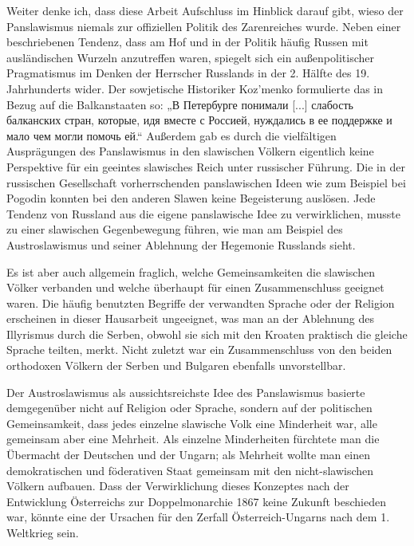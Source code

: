 \documentclass[12pt,headsepline,a4paper]{scrartcl}
\newcommand\textcyr[1]{{\fontencoding{OT2}\fontfamily{wncyr}\selectfont #1}}
\begin{document}
Weiter denke ich, dass diese Arbeit Aufschluss im Hinblick darauf gibt, wieso der
Panslawismus niemals zur offiziellen Politik des Zarenreiches wurde. Neben einer
beschriebenen Tendenz, dass am Hof und in der Politik häufig Russen mit ausländischen
Wurzeln anzutreffen waren, spiegelt sich ein außenpolitischer Pragmatismus im Denken der
Herrscher Russlands in der 2. Hälfte des 19. Jahrhunderts wider. Der sowjetische Historiker Koz'menko\autocite[191]{kozmenko}
formulierte das in Bezug auf die Balkanstaaten so: „\textcyr{В Петербурге понимали [...] слабость
балканских стран, которые, идя вместе с Россией, нуждались в ее поддержке и мало чем
могли помочь ей.}“ Außerdem gab es durch die vielfältigen Ausprägungen des Panslawismus
in den slawischen Völkern eigentlich keine Perspektive für ein geeintes slawisches Reich
unter russischer Führung. Die in der russischen Gesellschaft vorherrschenden panslawischen
Ideen wie zum Beispiel bei Pogodin konnten bei den anderen Slawen keine Begeisterung
auslösen. Jede Tendenz von Russland aus die eigene panslawische Idee zu verwirklichen,
musste zu einer slawischen Gegenbewegung führen, wie man am Beispiel des
Austroslawismus und seiner Ablehnung der Hegemonie Russlands sieht.

Es ist aber auch allgemein fraglich, welche Gemeinsamkeiten die slawischen Völker
verbanden und welche überhaupt für einen Zusammenschluss geeignet waren. Die häufig
benutzten Begriffe der verwandten Sprache oder der Religion erscheinen in dieser Hausarbeit
ungeeignet, was man an der Ablehnung des Illyrismus durch die Serben, obwohl sie sich mit
den Kroaten praktisch die gleiche Sprache teilten, merkt. Nicht zuletzt war ein
Zusammenschluss von den beiden orthodoxen Völkern der Serben und Bulgaren ebenfalls
unvorstellbar.

Der Austroslawismus als aussichtsreichste Idee des Panslawismus basierte demgegenüber
nicht auf Religion oder Sprache, sondern auf der politischen Gemeinsamkeit, dass jedes
einzelne slawische Volk eine Minderheit war, alle gemeinsam aber eine Mehrheit. Als
einzelne Minderheiten fürchtete man die Übermacht der Deutschen und der Ungarn; als
Mehrheit wollte man einen demokratischen und föderativen Staat gemeinsam mit den nicht-slawischen Völkern aufbauen. Dass der Verwirklichung dieses Konzeptes nach der
Entwicklung Österreichs zur Doppelmonarchie 1867 keine Zukunft beschieden war, könnte
eine der Ursachen für den Zerfall Österreich-Ungarns nach dem 1. Weltkrieg sein.
\end{document}
